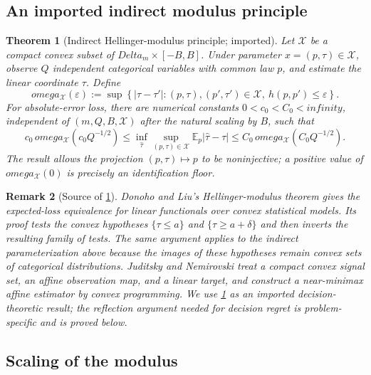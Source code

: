 \documentclass[11pt]{article}
\def\omega{omega}%
\def\infty{infinity}%
\def\Delta{Delta}%
\newtheorem{theorem}{Theorem}[section]
\newtheorem{remark}[theorem]{Remark}
\newcommand{\E}{\mathbb E}
\newcommand{\eps}{\varepsilon}
\begin{document}
\subsection{An imported indirect modulus principle}

\begin{theorem}[Indirect Hellinger-modulus principle; imported]
\label{thm:imported-modulus}
Let $\mathcal X$ be a compact convex subset of $\Delta_m\times[-B,B]$.  Under parameter $x=(p,\tau)\in\mathcal X$, observe $Q$ independent categorical variables with common law $p$, and estimate the linear coordinate $\tau$.  Define
\[
\omega_{\mathcal X}(\eps)
:=
\sup\left\{
|\tau-\tau'|:
(p,\tau),(p',\tau')\in\mathcal X,
\ h(p,p')\le\eps
\right\}.
\]
For absolute-error loss, there are numerical constants $0<c_0<C_0<\infty$, independent of $(m,Q,B,\mathcal X)$ after the natural scaling by $B$, such that
\begin{equation}
\label{eq:imported-modulus}
c_0\,\omega_{\mathcal X}(c_0Q^{-1/2})
\le
\inf_{\widehat\tau}
\sup_{(p,\tau)\in\mathcal X}
\E_p|\widehat\tau-\tau|
\le
C_0\,\omega_{\mathcal X}(C_0Q^{-1/2}).
\end{equation}
The result allows the projection $(p,\tau)\mapsto p$ to be noninjective; a positive value of $\omega_{\mathcal X}(0)$ is precisely an identification floor.
\end{theorem}

\begin{remark}[Source of \cref{thm:imported-modulus}]
Donoho and Liu's Hellinger-modulus theorem gives the expected-loss equivalence for linear functionals over convex statistical models.  Its proof tests the convex hypotheses $\{\tau\le a\}$ and $\{\tau\ge a+\delta\}$ and then inverts the resulting family of tests.  The same argument applies to the indirect parameterization above because the images of these hypotheses remain convex sets of categorical distributions.  Juditsky and Nemirovski treat a compact convex signal set, an affine observation map, and a linear target, and construct a near-minimax affine estimator by convex programming.  We use \cref{thm:imported-modulus} as an imported decision-theoretic result; the reflection argument needed for decision regret is problem-specific and is proved below.
\end{remark}

\subsection{Scaling of the modulus}
\end{document}
